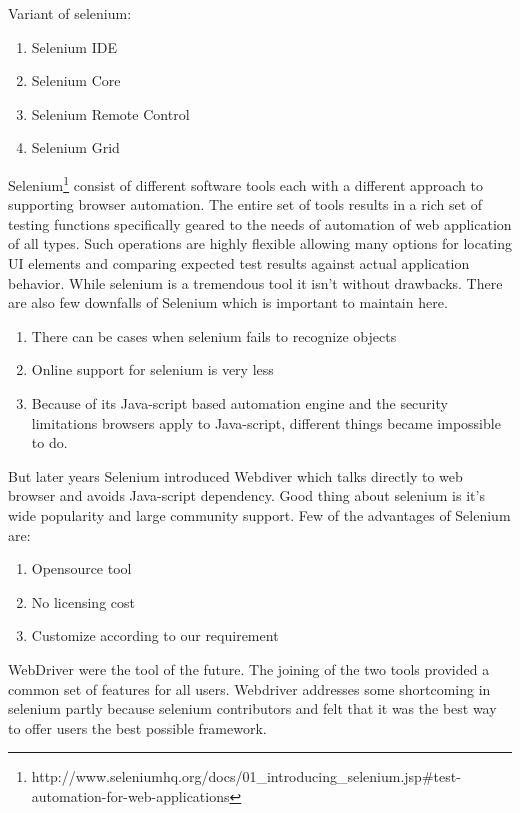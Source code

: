 \documentclass[article,type=msc,colorback,accentcolor=tud9c,twoside,11pt]{tudthesis}
\begin{document}
Variant of selenium:
\begin{enumerate}
\item Selenium IDE
\item Selenium Core
\item Selenium Remote Control
\item Selenium Grid
\end{enumerate}

Selenium\footnote{http://www.seleniumhq.org/docs/01\_introducing\_selenium.jsp\#test-automation-for-web-applications} consist of different software tools each with a different approach to supporting browser automation. The entire set of tools results in a rich set of testing functions specifically geared to the needs of automation of web application of all types. Such operations are highly flexible allowing many options for locating UI elements and comparing expected test results against actual application behavior. While selenium is a tremendous tool it isn't without drawbacks.
There are also few downfalls of Selenium which is important to maintain here.
\begin{enumerate}
	\item	There can be cases when selenium fails to recognize objects
	\item Online support for selenium is very less
	\item Because of its Java-script based automation engine and the security limitations browsers apply to Java-script, different things became impossible to do.
\end{enumerate}
 But later years Selenium introduced Webdiver which talks directly to web browser and avoids Java-script dependency. Good thing about selenium is it's wide popularity and large community support. Few of the advantages of Selenium are:
 \begin{enumerate}
 	\item Opensource tool
 	\item No licensing cost
 	\item Customize according to our requirement
 \end{enumerate}
  WebDriver were the tool of the future. The joining of the two tools provided a common set of features for all users. Webdriver addresses some shortcoming in selenium partly because selenium contributors and felt that it was the best way to offer users the best possible framework.
\end{document}
